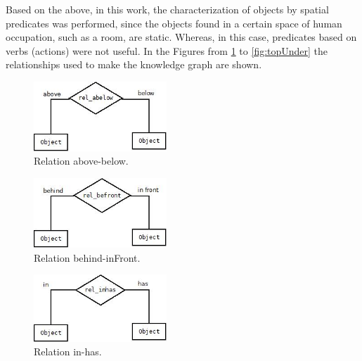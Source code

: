 Based on the above, in this work, the characterization of objects by spatial predicates was performed, since the objects found in a certain space of human occupation, such as a room, are static. Whereas, in this case, predicates based on verbs (actions) were not useful. In the Figures from \ref{fig:abelow} to \ref{fig:topUnder} the relationships used to make the knowledge graph are shown.

\begin{figure}[H]
    \centering
    \includegraphics[width=5cm]{figures/abelow.jpg}
    \caption{Relation above-below.}
    \label{fig:abelow}
\end{figure}

\begin{figure}[H]
    \centering
    \includegraphics[width=5cm]{figures/befront.jpg}
    \caption{Relation behind-inFront.}
    \label{fig:befront}
\end{figure}

\begin{figure}[H]
    \centering
    \includegraphics[width=5cm]{figures/inhas.jpg}
    \caption{Relation in-has.}
    \label{fig:inhas}
\end{figure}

